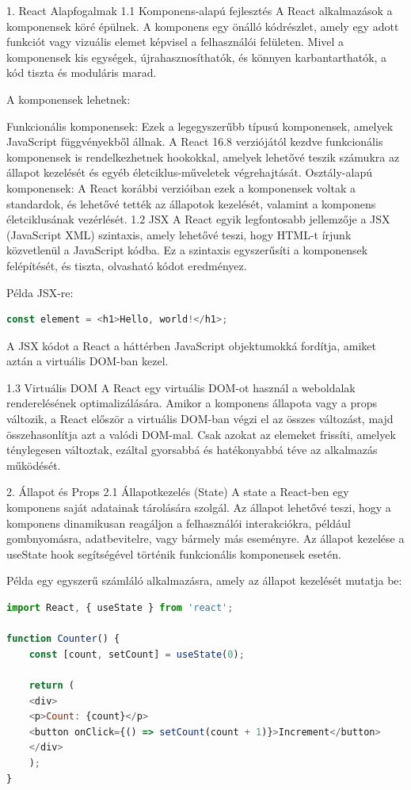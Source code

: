 \documentclass[colorlinks]{thesis-kando}
\theoremstyle{definition}
\theoremstyle{remark}
\begin{document}
1. React Alapfogalmak
1.1 Komponens-alapú fejlesztés
A React alkalmazások a komponensek köré épülnek. A komponens egy önálló kódrészlet, amely egy adott funkciót vagy vizuális elemet képvisel a felhasználói felületen. Mivel a komponensek kis egységek, újrahasznosíthatók, és könnyen karbantarthatók, a kód tiszta és moduláris marad.

A komponensek lehetnek:

Funkcionális komponensek: Ezek a legegyszerűbb típusú komponensek, amelyek JavaScript függvényekből állnak. A React 16.8 verziójától kezdve funkcionális komponensek is rendelkezhetnek hookokkal, amelyek lehetővé teszik számukra az állapot kezelését és egyéb életciklus-műveletek végrehajtását.
Osztály-alapú komponensek: A React korábbi verzióiban ezek a komponensek voltak a standardok, és lehetővé tették az állapotok kezelését, valamint a komponens életciklusának vezérlését.
1.2 JSX
A React egyik legfontosabb jellemzője a JSX (JavaScript XML) szintaxis, amely lehetővé teszi, hogy HTML-t írjunk közvetlenül a JavaScript kódba. Ez a szintaxis egyszerűsíti a komponensek felépítését, és tiszta, olvasható kódot eredményez.

Példa JSX-re:
\begin{lstlisting}[language=JavaScript]
const element = <h1>Hello, world!</h1>;
\end{lstlisting}
A JSX kódot a React a háttérben JavaScript objektumokká fordítja, amiket aztán a virtuális DOM-ban kezel.

1.3 Virtuális DOM
A React egy virtuális DOM-ot használ a weboldalak renderelésének optimalizálására. Amikor a komponens állapota vagy a props változik, a React először a virtuális DOM-ban végzi el az összes változást, majd összehasonlítja azt a valódi DOM-mal. Csak azokat az elemeket frissíti, amelyek ténylegesen változtak, ezáltal gyorsabbá és hatékonyabbá téve az alkalmazás működését.

2. Állapot és Props
2.1 Állapotkezelés (State)
A state a React-ben egy komponens saját adatainak tárolására szolgál. Az állapot lehetővé teszi, hogy a komponens dinamikusan reagáljon a felhasználói interakciókra, például gombnyomásra, adatbevitelre, vagy bármely más eseményre. Az állapot kezelése a useState hook segítségével történik funkcionális komponensek esetén.

Példa egy egyszerű számláló alkalmazásra, amely az állapot kezelését mutatja be:
\begin{lstlisting}[language=JavaScript]
import React, { useState } from 'react';

function Counter() {
	const [count, setCount] = useState(0);
	
	return (
	<div>
	<p>Count: {count}</p>
	<button onClick={() => setCount(count + 1)}>Increment</button>
	</div>
	);
}
	

\end{lstlisting}
\end{document}
